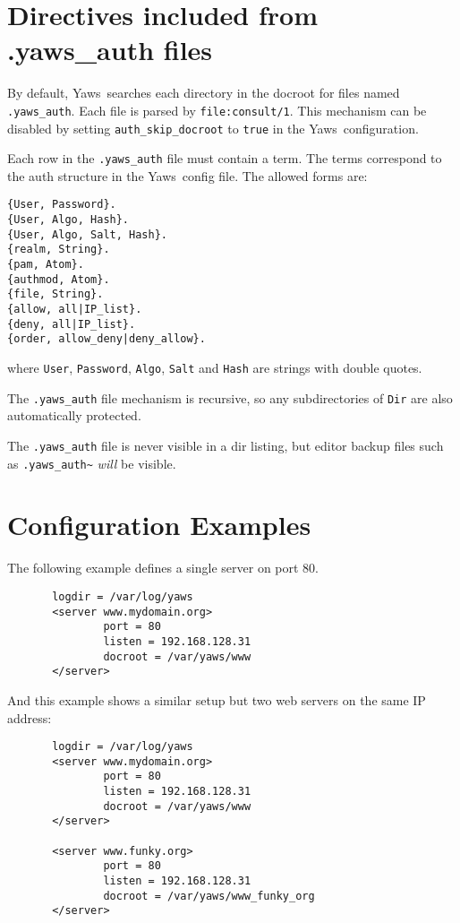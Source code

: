 \documentclass[11pt,oneside,english]{book}
\newcommand{\Yaws}            %
        {{\sc Yaws}}
\begin{document}
\section{Directives included from .yaws\_auth files}

        By default, \Yaws\ searches each directory in the docroot for files
        named \verb+.yaws_auth+. Each file is parsed by \verb+file:consult/1+.
        This mechanism can be disabled by setting \verb+auth_skip_docroot+ to
        \verb+true+ in the \Yaws\ configuration.

        Each row in the \verb+.yaws_auth+ file must contain a term. 
        The terms correspond to the auth structure in the \Yaws\ config 
        file. The allowed forms are:

\begin{verbatim}
{User, Password}.
{User, Algo, Hash}.
{User, Algo, Salt, Hash}.
{realm, String}.
{pam, Atom}.
{authmod, Atom}.
{file, String}.
{allow, all|IP_list}.
{deny, all|IP_list}.
{order, allow_deny|deny_allow}.
\end{verbatim}

        where \verb+User+, \verb+Password+, \verb+Algo+, \verb+Salt+ and
        \verb+Hash+ are strings with double quotes.

        The \verb+.yaws_auth+ file mechanism is recursive, so any
        subdirectories of \verb+Dir+ are also automatically
        protected.

        The \verb+.yaws_auth+ file is never visible in a dir
        listing, but editor backup files such as
        \verb+.yaws_auth~+ \emph{will} be visible.


\section{Configuration Examples}

       The  following  example  defines a single server on
       port 80.

\begin{verbatim}
       logdir = /var/log/yaws
       <server www.mydomain.org>
               port = 80
               listen = 192.168.128.31
               docroot = /var/yaws/www
       </server>
\end{verbatim}

       And this example shows a similar setup but two web
       servers on the same IP address:

\begin{verbatim}
       logdir = /var/log/yaws
       <server www.mydomain.org>
               port = 80
               listen = 192.168.128.31
               docroot = /var/yaws/www
       </server>

       <server www.funky.org>
               port = 80
               listen = 192.168.128.31
               docroot = /var/yaws/www_funky_org
       </server>
\end{verbatim}
\end{document}
